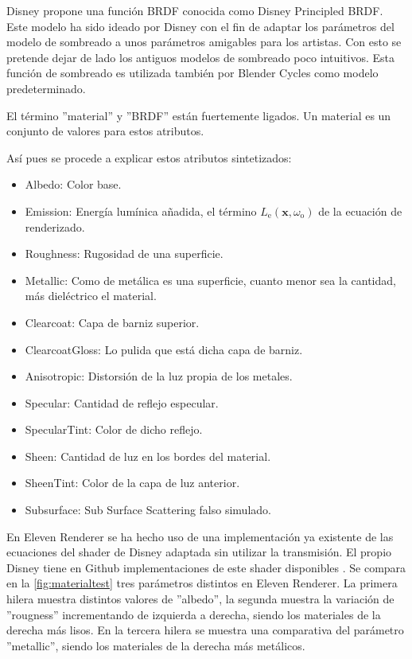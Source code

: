 Disney propone una función BRDF conocida como Disney Principled BRDF\cite{burley2012physically}. Este modelo ha sido ideado por Disney con el fin de adaptar los parámetros del modelo de sombreado a unos parámetros amigables para los artistas. Con esto se pretende dejar de lado los antiguos modelos de sombreado poco intuitivos. Esta función de sombreado es utilizada también por Blender Cycles como modelo predeterminado.
	
El término ''material'' y ''BRDF'' están fuertemente ligados. Un material es un conjunto de valores para estos atributos.
		
Así pues se procede a explicar estos atributos sintetizados:

\begin{itemize}

	\item Albedo: Color base.
	\item Emission: Energía lumínica añadida, el término $L_{\text{e}}(\mathbf {x} ,\omega _{\text{o}})$ de la ecuación de renderizado.
	\item Roughness: Rugosidad de una superficie.
	\item Metallic: Como de metálica es una superficie, cuanto menor sea la cantidad, más dieléctrico el material.
	\item Clearcoat: Capa de barniz superior.
	\item ClearcoatGloss: Lo pulida que está dicha capa de barniz.
	\item Anisotropic: Distorsión de la luz propia de los metales.
	\item Specular: Cantidad de reflejo especular.
	\item SpecularTint: Color de dicho reflejo.
	\item Sheen: Cantidad de luz en los bordes del material.
	\item SheenTint: Color de la capa de luz anterior.
	\item Subsurface: Sub Surface Scattering falso simulado.
	
\end{itemize}

En Eleven Renderer se ha hecho uso de una implementación ya existente \cite{knightcrawler25} de las ecuaciones del shader de Disney adaptada sin utilizar la transmisión. El propio Disney tiene en Github implementaciones de este shader disponibles \cite{disneyrepo}. Se compara en la \autoref{fig:materialtest} tres parámetros distintos en Eleven Renderer. La primera hilera muestra distintos valores de ''albedo'', la segunda muestra la variación de ''rougness'' incrementando de izquierda a derecha, siendo los materiales de la derecha más lisos. En la tercera hilera se muestra una comparativa del parámetro ''metallic'', siendo los materiales de la derecha más metálicos.

